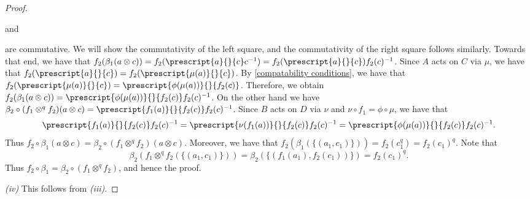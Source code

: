 \documentclass[12pt]{elsarticle}
\newtheorem*{main corollary*}{Main Corollary}
\theoremstyle{definition}
\newcommand{\tens}{
	\otimes^q}
\begin{document}
\begin{proof}
\begin{center}
   \quad and \quad{}
    \end{center}
    are commutative. We will show the commutativity of the left square, and the commutativity of the right square follows similarly. Towards that end, we have that $f_2(\beta_1(a \otimes c))=f_2(\prescript{a}{}{c}c^{-1})=f_2(\prescript{a}{}{c})f_2(c)^{-1}$. Since $A$ acts on $C$ via $\mu$, we have that $f_2(\prescript{a}{}{c})=f_2(\prescript{\mu(a)}{}{c})$. By \eqref{compatability conditions}, we have that ${f_2(\prescript{\mu(a)}{}{c})=\prescript{\phi(\mu(a))}{}{f_2(c)}}$. Therefore, we obtain $f_2(\beta_1(a \otimes c))=\prescript{\phi(\mu(a))}{}{f_2(c)}f_2(c)^{-1}$. On the other hand we have $\beta_2 \circ (f_1 \tens f_2)(a \otimes c)=\prescript{f_1(a)}{}{f_2(c)}f_2(c)^{-1}$. Since $B$ acts on $D$ via $\nu$ and $\nu \circ f_1=\phi \circ \mu$, we have that 
    \begin{equation*}
        \prescript{f_1(a)}{}{f_2(c)}f_2(c)^{-1}=\prescript{\nu(f_1(a))}{}{f_2(c)}f_2(c)^{-1}=\prescript{\phi(\mu(a))}{}{f_2(c)}f_2(c)^{-1}.
    \end{equation*}
    Thus $f_2 \circ \beta_1 (a \otimes c)=\beta_2 \circ (f_1 \tens f_2)(a \otimes c)$. Moreover, we have that $f_2(\beta_1(\{(a_1,c_1)\}))=f_2(c_1^q)=f_2(c_1)^q$. Note that 
    \begin{equation*}
        \beta_2 (f_1 \tens f_2(\{(a_1,c_1)\}))=\beta_2(\{(f_1(a_1),f_2(c_1))\})=f_2(c_1)^q.
    \end{equation*}
    Thus $f_2 \circ \beta_1 = \beta_2 \circ (f_1 \tens f_2)$, and hence the proof.
    \par\textit{(iv)} This follows from \textit{(iii)}.
 \end{proof}
\end{document}
